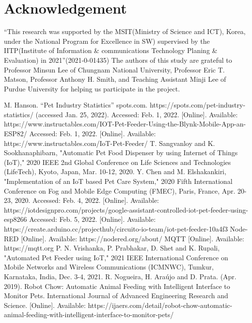 \documentclass[conference]{IEEEtran}
\begin{document}
\section{Acknowledgement}
“This research was supported by the MSIT(Ministry of Science and ICT), Korea, under the National Program for Excellence in SW) supervised by the IITP(Institute of Information \& communications Technology Planing \& Evaluation) in 2021”(2021-0-01435)
The authors of this study are grateful to Professor Minsun Lee of Chungnam National University, Professor Eric T. Matson, Professor Anthony H. Smith, and Teaching Assistant Minji Lee of Purdue University for helping us participate in the project.

\begin{thebibliography}{00}
M.  Hanson.  “Pet  Industry  Statistics”  spots.com.  https://spots.com/pet-industry-statistics/ (accessed Jan. 25, 2022). 
Accessed: Feb. 1, 2022. [Online]. Available: https://www.instructables.com/IOT-Pet-Feeder-Using-the-Blynk-Mobile-App-an-ESP82/
Accessed: Feb. 1, 2022. [Online]. Available: https://www.instructables.com/IoT-Pet-Feeder/
T. Sangvanloy and K. Sookhanaphibarn, "Automatic Pet Food Dispenser by using Internet of Things (IoT)," 2020 IEEE 2nd Global Conference on Life Sciences and Technologies (LifeTech), Kyoto, Japan, Mar. 10-12, 2020.
Y. Chen and M. Elshakankiri, "Implementation of an IoT based Pet Care System," 2020 Fifth International Conference on Fog and Mobile Edge Computing (FMEC), Paris, France, Apr. 20-23, 2020.
Accessed: Feb. 4, 2022. [Online]. Available: https://iotdesignpro.com/projects/google-assistant-controlled-iot-pet-feeder-using-esp8266
Accessed: Feb. 5, 2022. [Online]. Available: https://create.arduino.cc/projecthub/circuito-io-team/iot-pet-feeder-10a4f3
Node-RED [Online]. Available: https://nodered.org/about/
MQTT [Online]. Available: https://mqtt.org
P. N. Vrishanka, P. Prabhakar, D. Shet and K. Rupali, "Automated Pet Feeder using IoT," 2021 IEEE International Conference on Mobile Networks and Wireless Communications (ICMNWC), Tumkur, Karnataka, India, Dec. 3-4, 2021.
R. Nogueira, H. Araújo and D. Prata. (Apr. 2019). Robot Chow: Automatic Animal Feeding with Intelligent Interface to Monitor Pets. International Journal of Advanced Engineering Research and Science. [Online]. Available: https://ijaers.com/detail/robot-chow-automatic-animal-feeding-with-intelligent-interface-to-monitor-pets/

\end{thebibliography}
\end{document}

